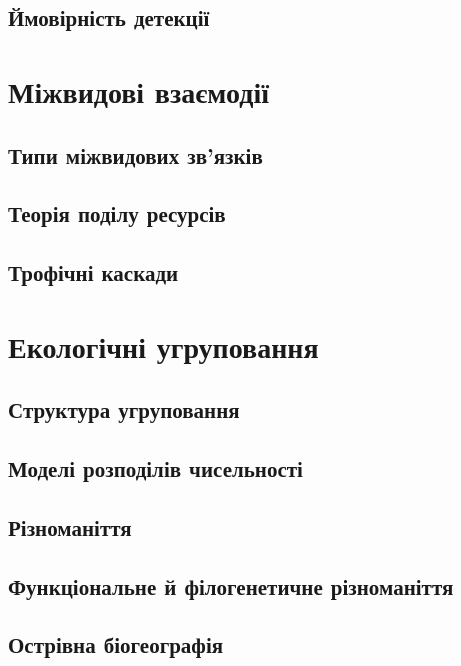 \documentclass[
  11pt,
]{book}
\begin{document}
\section{Ймовірність детекції}\label{detectability}

\chapter{Міжвидові взаємодії}\label{interspecific}

\section{Типи міжвидових зв'язків}\label{relationships}

\section{Теорія поділу ресурсів}\label{rstar}

\section{Трофічні каскади}\label{cascade}

\chapter{Екологічні угруповання}\label{comecol}

\section{Структура угруповання}\label{sad}

\section{Моделі розподілів чисельності}\label{sad-model}

\section{Різноманіття}\label{diversity}

\section{Функціональне й філогенетичне різноманіття}\label{fd}

\section{Острівна біогеографія}\label{islands}
\end{document}
